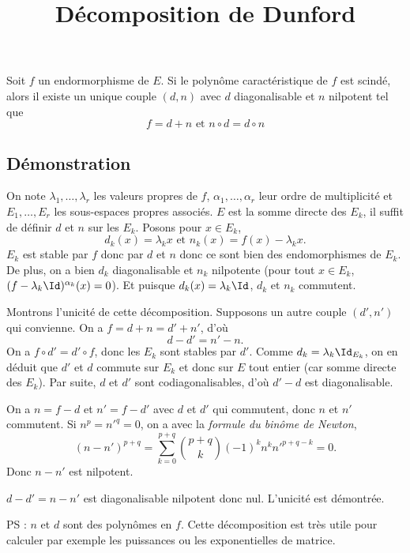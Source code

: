 \documentclass[fontsize=12pt,twoside=false,parskip=half]{scrartcl}
\title{Décomposition de Dunford}
\date{}
\author{}
\begin{document}
\maketitle
   \begin{Theoreme}
      Soit $f$ un endormorphisme de $E$. Si le polynôme caractéristique de $f$ est scindé, alors 
      il existe un unique couple $(d, n)$ avec $d$ diagonalisable et $n$ nilpotent tel que
      \[
         f = d + n \text{ et } n \circ d = d \circ n
      \]
   \end{Theoreme}
   \subsection{Démonstration}
      On note $\lambda_1, \ldots, \lambda_r$ les valeurs propres de $f$, $\alpha_1, \ldots, \alpha_r$ leur ordre de 
      multiplicité et $E_1, \ldots, E_r$ les sous-espaces propres associés. $E$ est la somme directe des $E_k$, il 
      suffit de définir $d$ et $n$ sur les $E_k$. Posons pour $x \in E_k$,
      \[
         d_k(x) = \lambda_k x \text{ et } n_k(x) = f(x) - \lambda_k x.
      \]
      $E_k$ est stable par $f$ donc par $d$ et $n$ donc ce sont bien des endomorphismes de $E_k$. De plus, 
      on a bien $d_k$ diagonalisable et $n_k$ nilpotente (pour tout $x \in E_k$, $(f - \lambda_k \Id)^{\alpha_k}(x) = 0$). 
      Et puisque $d_k(x) = \lambda_k \Id$, $d_k$ et $n_k$ commutent.

      Montrons l’unicité de cette décomposition. Supposons un autre couple $(d', n')$ qui convienne. On a $f = d + n = d' + n'$, d'où
      \[
         d - d' = n' - n.
      \]        
      On a $f \circ d' = d' \circ f$, donc les $E_k$ sont stables par $d'$. Comme $d_k = \lambda_k \Id_{E_k}$, on en déduit que $d'$ et $d$ commute sur $E_k$ et donc sur $E$ tout entier (car somme directe des $E_k$). Par suite, $d$ et $d'$ sont codiagonalisables, d'où $d' - d$ est diagonalisable.
      
      On a $n = f - d$ et $n' = f - d'$ avec $d$ et $d'$ qui commutent, donc $n$ et $n'$ 
      commutent. Si $n^p = n'^q = 0$, on a avec la \emph{formule du binôme de Newton},
      \[
         (n - n')^{p + q} = \sum_{k = 0}^{p + q} \binom{p + q}{k} (-1)^k n^k n'^{p + q - k} = 0.
      \]
      Donc $n - n'$ est nilpotent.
      
      $d - d' = n - n'$ est diagonalisable nilpotent donc nul. L’unicité est démontrée.
      
      PS : $n$ et $d$ sont des polynômes en $f$. Cette décomposition est très utile pour calculer par exemple les 
      puissances ou les exponentielles de matrice.
  
      
\end{document}
